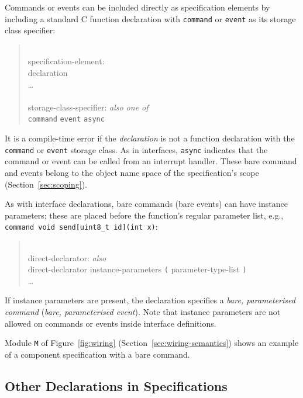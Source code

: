\documentclass[11pt,letterpaper]{article}
\newcommand{\kw}[1]{{\tt #1}}
\newcommand{\code}[1]{{\tt #1}}
\newcommand{\grammarshift}{\vspace*{-.7cm}}
\newcommand{\grammarindent}{\hspace*{2cm}\= \\ \kill}
\begin{document}
Commands or events can be included directly as specification elements by
including a standard C function declaration with
\kw{command} or \kw{event} as its storage class specifier:
\begin{quote} \grammarshift \em \begin{tabbing}
\grammarindent
specification-element:\\
\>	declaration\\
\>	\ldots\\
\\
storage-class-specifier: \emph{also one of}\\
\>	\kw{command} \kw{event} \kw{async}\\
\end{tabbing} \end{quote}
It is a compile-time error if the \emph{declaration} is not a function
declaration with the \kw{command} or \kw{event} storage class. As in
interfaces, \kw{async} indicates that the command or event can be called
from an interrupt handler. These bare command and events belong to the
object name space of the specification's scope (Section~\ref{sec:scoping}).

As with interface declarations, bare commands (bare events) can have instance
parameters; these are placed before
the function's regular parameter list, e.g., \code{command void
send[uint8\_t id](int x)}: 
\begin{quote} \grammarshift \em \begin{tabbing}
\grammarindent
direct-declarator: \emph{also}\\
\>	direct-declarator instance-parameters \kw{(} parameter-type-list \kw{)}\\
\>	\ldots
\end{tabbing} \end{quote}

If instance parameters are present, the declaration specifies a \emph{bare,
parameterised command} (\emph{bare, parameterised event}). Note that
instance parameters are not allowed on commands or events inside interface
definitions.

Module \code{M} of Figure~\ref{fig:wiring}
(Section~\ref{sec:wiring-semantics}) shows an example of a component
specification with a bare command.

\subsection{Other Declarations in Specifications}
\label{sec:spec-other}
\end{document}
